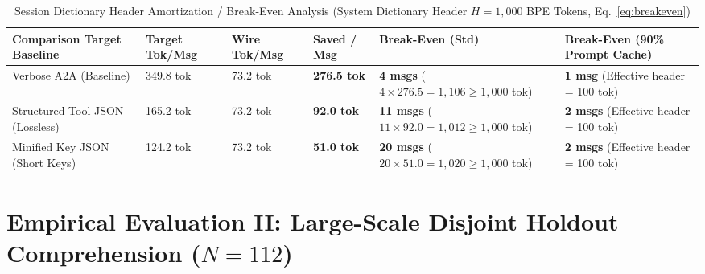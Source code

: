 \documentclass[9pt,a4paper]{extarticle}
\begin{document}
\begin{table}[h!]
\centering
\caption{Session Dictionary Header Amortization / Break-Even Analysis (System Dictionary Header $H = 1{,}000$ BPE Tokens, Eq.\ \ref{eq:breakeven})}
\label{tab:breakeven}
\footnotesize
\renewcommand{\arraystretch}{0.96}
\setlength{\tabcolsep}{2.5pt}
\begin{tabularx}{\textwidth}{L{3.7cm} R{1.9cm} R{1.9cm} R{1.9cm} R{2.4cm} Y}
\toprule
{}
\textbf{\color{white}Comparison Target Baseline} &
\textbf{\color{white}Target Tok/Msg} &
\textbf{\color{white}Wire Tok/Msg} &
\textbf{\color{white}Saved / Msg} &
\textbf{\color{white}Break-Even (Std)} &
\textbf{\color{white}Break-Even (90\% Prompt Cache)} \\
\midrule
Verbose A2A (Baseline) & 349.8 tok & 73.2 tok & \textbf{276.5 tok} & \textbf{4 msgs} ($4 \times 276.5 = 1{,}106 \ge 1{,}000$ tok) & \textbf{1 msg} (Effective header = 100 tok) \\
Structured Tool JSON (Lossless) & 165.2 tok & 73.2 tok & \textbf{92.0 tok} & \textbf{11 msgs} ($11 \times 92.0 = 1{,}012 \ge 1{,}000$ tok) & \textbf{2 msgs} (Effective header = 100 tok) \\
Minified Key JSON (Short Keys) & 124.2 tok & 73.2 tok & \textbf{51.0 tok} & \textbf{20 msgs} ($20 \times 51.0 = 1{,}020 \ge 1{,}000$ tok) & \textbf{2 msgs} (Effective header = 100 tok) \\
\bottomrule
\end{tabularx}
\end{table}

\section{Empirical Evaluation II: Large-Scale Disjoint Holdout Comprehension ($N = 112$)}
\end{document}
